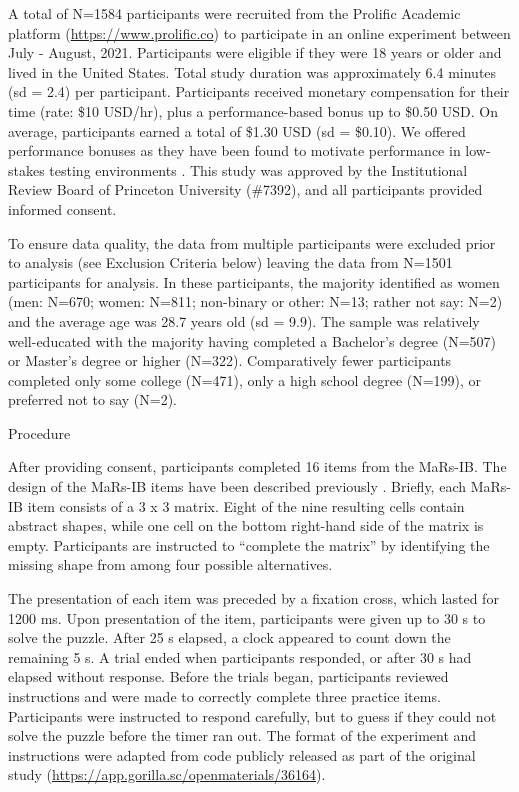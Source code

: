 \documentclass[a4paper,man,natbib]{apa6}
\makeatletter
\renewcommand{\subsubsection}{\@startsection{subsubsection}{3}
  {\z@}%
  {\b@level@two@skip}{\e@level@two@skip}%
  {\normalfont\normalsize\bfseries}}
\makeatother
\begin{document}
A total of N=1584 participants were recruited from the Prolific Academic platform (\url{https://www.prolific.co}) to participate in an online experiment between July - August, 2021. Participants were eligible if they were 18 years or older and lived in the United States. Total study duration was approximately 6.4 minutes (sd = 2.4) per participant. Participants received monetary compensation for their time (rate: \$10 USD/hr), plus a performance-based bonus up to \$0.50 USD. On average, participants earned a total of \$1.30 USD (sd = \$0.10). We offered performance bonuses as they have been found to motivate performance in low-stakes testing environments \citep{duckworth2011role, gignac2018moderate}. This study was approved by the Institutional Review Board of Princeton University (\#7392), and all participants provided informed consent.

To ensure data quality, the data from multiple participants were excluded prior to analysis (see Exclusion Criteria below) leaving the data from N=1501 participants for analysis. In these participants, the majority identified as women (men: N=670; women: N=811; non-binary or other: N=13; rather not say: N=2) and the average age was 28.7 years old (sd = 9.9). The sample was relatively well-educated with the majority having completed a Bachelor's degree (N=507) or Master's degree or higher (N=322). Comparatively fewer participants completed only some college (N=471), only a high school degree (N=199), or preferred not to say (N=2). 

\subsubsection{Procedure}

After providing consent, participants completed 16 items from the MaRs-IB. The design of the MaRs-IB items have been described previously \citep{chierchia2019matrix}. Briefly, each MaRs-IB item consists of a 3 x 3 matrix. Eight of the nine resulting cells contain abstract shapes, while one cell on the bottom right-hand side of the matrix is empty. Participants are instructed to ``complete the matrix'' by identifying the missing shape from among four possible alternatives. 

The presentation of each item was preceded by a fixation cross, which lasted for 1200 ms. Upon presentation of the item, participants were given up to 30 s to solve the puzzle. After 25 s elapsed, a clock appeared to count down the remaining 5 s. A trial ended when participants responded, or after 30 s had elapsed without response. Before the trials began, participants reviewed instructions and were made to correctly complete three practice items. Participants were instructed to respond carefully, but to guess if they could not solve the puzzle before the timer ran out. The format of the experiment and instructions were adapted from code publicly released as part of the original study (\url{https://app.gorilla.sc/openmaterials/36164}).
\end{document}
